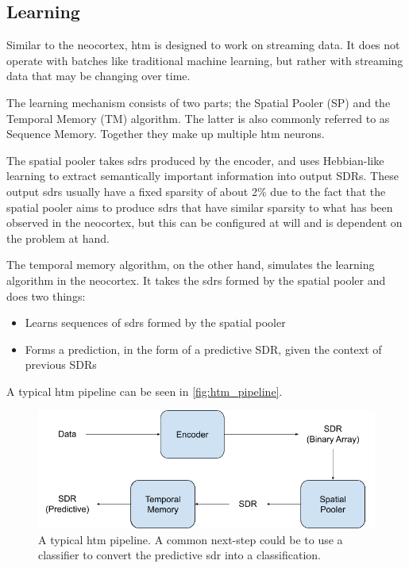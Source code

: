 \subsection{Learning}
Similar to the neocortex, \gls*{htm} is designed to work on streaming data. It does not operate with batches like traditional machine learning, but rather with streaming data that may be changing over time. \par
The learning mechanism consists of two parts; the Spatial Pooler (SP) and the Temporal Memory (TM) algorithm. The latter is also commonly referred to as Sequence Memory. Together they make up multiple \gls*{htm} neurons.\par
The spatial pooler takes \glspl*{sdr} produced by the encoder, and uses Hebbian-like learning to extract semantically important information into output SDRs. These output \glspl*{sdr} usually have a fixed sparsity of about 2\% due to the fact that the spatial pooler aims to produce \glspl*{sdr} that have similar sparsity to what has been observed in the neocortex, but this can be configured at will and is dependent on the problem at hand.\par
The temporal memory algorithm, on the other hand, simulates the learning algorithm in the neocortex. It takes the \glspl*{sdr} formed by the spatial pooler and does two things:
\begin{itemize}
    \item Learns sequences of \glspl*{sdr} formed by the spatial pooler
    \item Forms a prediction, in the form of a predictive SDR,  given the context of previous SDRs
\end{itemize}
A typical \gls*{htm} pipeline can be seen in \autoref{fig:htm_pipeline}.
\begin{figure}[htb]
    \centering
    \includegraphics[width=0.7\linewidth]{resources/related_works/htm_pipeline.png}
    \caption[The HTM Pipeline]{A typical \gls*{htm} pipeline. A common next-step could be to use a classifier to convert the predictive \gls*{sdr} into a classification. }
    \label{fig:htm_pipeline}
\end{figure}
\par
